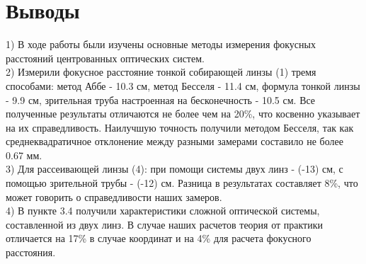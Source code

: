 \documentclass[a4paper, 12pt]{article}%
\begin{document}
	\section{Выводы}
	1) В ходе работы были изучены основные методы измерения фокусных расстояний центрованных оптических систем.\\
	2) Измерили фокусное расстояние тонкой собирающей линзы (1) тремя способами: метод Аббе - 10.3 см, метод Бесселя - 11.4 см, формула тонкой линзы - 9.9 см, зрительная труба настроенная на бесконечность - 10.5 см. Все полученные результаты отличаются не более чем на 20\%, что косвенно указывает на их справедливость. Наилучшую точность получили методом Бесселя, так как среднеквадратичное отклонение между разными замерами составило не более 0.67 мм.\\
	3) Для рассеивающей линзы (4): при помощи системы двух линз - (-13) см, с помощью зрительной трубы - (-12) см. Разница в результатах составляет 8\%, что может говорить о справедливости наших замеров.\\
	4) В пункте 3.4 получили характеристики сложной оптической системы, составленной из двух линз. В случае наших расчетов теория от практики отличается на 17\% в случае координат и на 4\% для расчета фокусного расстояния.\\
\end{document}
